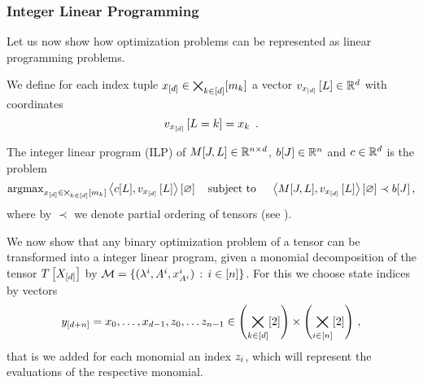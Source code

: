 


\subsubsection{Integer Linear Programming}

Let us now show how optimization problems can be represented as linear programming problems.

We define for each index tuple $x_{[d]}\in\bigtimes_{k\in[d]}[m_{k}]$ a vector $v_{x_{[d]}}\left[L\right]\in\mathbb{R}^{d}$ with coordinates
	\[ \statevectorofat{\shortcatindices}{\selvariable=\catenumerator} = \catindexof{\catenumerator} \, .  \]

\begin{definition}
	The integer linear program (ILP) of $M[J,L]\in\mathbb{R}^{n \times d}$, $b[J]\in\mathbb{R}^{n}$ and $c\in\mathbb{R}^{d}$ is the problem
	\begin{align*}
		\mathrm{argmax}_{x_{[d]}\in\bigtimes_{k\in[d]}[m_{k}]} \left\langle c[L], v_{x_{[d]}}\left[L\right]\right\rangle \left[ \varnothing \right]
		 \quad \text{subject to } \quad \left\langle M[J,L],v_{x_{[d]}}\left[L\right]\right\rangle \left[ \varnothing \right] \prec b[J] \, ,
	\end{align*}
	where by $\prec$ we denote partial ordering of tensors (see ).
\end{definition}


We now show that any binary optimization problem of a tensor can be transformed into a integer linear program, given a monomial decomposition of the tensor $T\left[X_{[d]}\right]$ by $\mathcal{M}=\{(\lambda^{i}, A^{i}, x_{A^{i}}^{i}) \, : \, i\in[n]\}$.
For this we choose state indices by vectors
\begin{align*}
	y_{[d+n]} = x_{0},\ldots,x_{d-1},z_{0},\ldots z_{n-1} \in \left(\bigtimes_{k\in[d]}[2]\right) \times  \left(\bigtimes_{i\in[n]}[2]\right) \, ,
\end{align*}
that is we added for each monomial an index $z_{i}$, which will represent the evaluations of the respective monomial.


